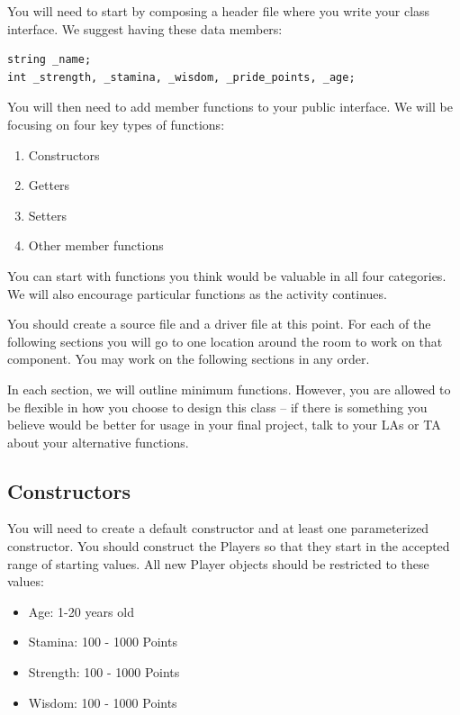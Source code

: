 You will need to start by composing a header file where you write your class interface. We suggest having these data members:

\begin{verbatim}
string _name;
int _strength, _stamina, _wisdom, _pride_points, _age;
\end{verbatim}

You will then need to add member functions to your public interface. We will be focusing on four key types of functions:

\begin{enumerate}
    \item Constructors
    \item Getters
    \item Setters
    \item Other member functions
\end{enumerate}

You can start with functions you think would be valuable in all four categories. We will also encourage particular functions as the activity continues. 

You should create a source file and a driver file at this point. For each of the following sections you will go to one location around the room to work on that component. You may work on the following sections in any order. 

In each section, we will outline minimum functions. However, you are allowed to be flexible in how you choose to design this class -- if there is something you believe would be better for usage in your final project, talk to your LAs or TA about your alternative functions.

\subsection{Constructors}

You will need to create a default constructor and at least one parameterized constructor. You should construct the Players so that they start in the accepted range of starting values. All new Player objects should be restricted to these values:

\begin{itemize}
\item Age: 1-20 years old
\item Stamina: 100 - 1000 Points
\item Strength: 100 - 1000 Points
\item Wisdom: 100 - 1000 Points
\end{itemize}

